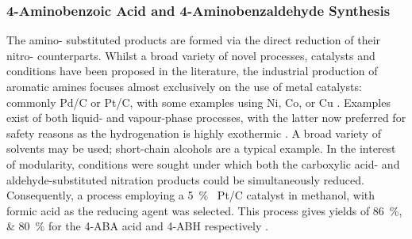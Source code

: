 \subsubsection{4-Aminobenzoic Acid and 4-Aminobenzaldehyde Synthesis}
The amino- substituted products are formed via the direct reduction of their nitro- counterparts.
Whilst a broad variety of novel processes, catalysts and conditions have been proposed in the literature, the industrial production of aromatic amines focuses almost exclusively on the use of metal catalysts: commonly Pd/C or Pt/C, with some examples using Ni, Co, or Cu \cite{vogt_amines_2000,cartolano_amines_2004}.
Examples exist of both liquid- and vapour-phase processes, with the latter now preferred for safety reasons as the hydrogenation is highly exothermic \cite{vogt_amines_2000}.
A broad variety of solvents may be used; short-chain alcohols are a typical example.
In the interest of modularity, conditions were sought under which both the carboxylic acid- and aldehyde-substituted nitration products could be simultaneously reduced.
Consequently, a process employing a \SI{5}{\percent{}} Pt/C catalyst in methanol, with formic acid as the reducing agent was selected.
This process gives yields of \SIlist{86;80}{\percent} for the 4-ABA acid and 4-ABH respectively \cite{gowda_catalytic_2000}.




